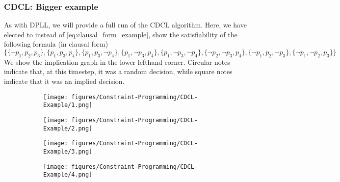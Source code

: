 \subsubsection{CDCL: Bigger example}
As with DPLL, we will provide a full run of the CDCL algorithm. Here, we have elected to instead of \autoref{eq:clausal_form_example}, show the satisfiability of the following formula (in clausal form)
\begin{equation*}
    \Big\{
        \{
            \neg p_1, p_2, p_3
        \},
        \{
            p_1, p_3, p_4
        \},
        \{
            p_1, p_3, \neg p_4
        \},
        \{
            p_1, \neg p_3, p_4
        \},
        \{
            p_1, \neg p_3, \neg p_4
        \},
        \{
            \neg p_2, \neg p_3, p_4
        \},
        \{
            \neg p_1, p_2, \neg p_3
        \},
        \{
            \neg p_1, \neg p_2, p_3
        \}
    \Big\}
\end{equation*}
We show the implication graph in the lower lefthand corner. Circular notes indicate that, at this timestep, it was a random decision, while square notes indicate that it was an implied decision.
\begin{figure}[H]
    \centering
    \begin{subfigure}[t]{0.48\textwidth}
        \centering
        \texttt{[image: figures/Constraint-Programming/CDCL-Example/1.png]}
    \end{subfigure}
    \hfill
    \begin{subfigure}[t]{0.48\textwidth}
        \centering
        \texttt{[image: figures/Constraint-Programming/CDCL-Example/2.png]}
    \end{subfigure}
\end{figure}

\begin{figure}[H]
    \centering
    \begin{subfigure}[t]{0.48\textwidth}
        \centering
        \texttt{[image: figures/Constraint-Programming/CDCL-Example/3.png]}
    \end{subfigure}
    \hfill
    \begin{subfigure}[t]{0.48\textwidth}
        \centering
        \texttt{[image: figures/Constraint-Programming/CDCL-Example/4.png]}
    \end{subfigure}
\end{figure}

